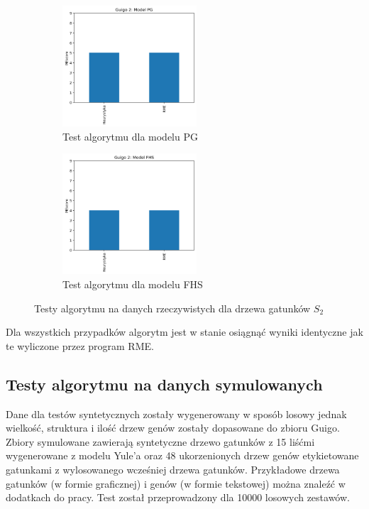 \documentclass[licencjacka]{pracamgr}
\begin{document}
\begin{figure}[H]
\centering
\begin{subfigure}{.5\textwidth}
  \centering
  \includegraphics[width=50mm]{./pictures/G2_PG.png}
  \caption{Test algorytmu dla modelu PG}
\end{subfigure}%
\begin{subfigure}{.5\textwidth}
  \centering
  \includegraphics[width=50mm]{./pictures/G2_FHS.png}
  \caption{Test algorytmu dla modelu FHS}
\end{subfigure}%
\caption{Testy algorytmu na danych rzeczywistych dla drzewa gatunków $S_2$}
\end{figure}

Dla wszystkich przypadków algorytm jest w stanie osiągnąć wyniki identyczne jak te wyliczone przez program RME. 

\subsection{Testy algorytmu na danych symulowanych}
Dane dla testów syntetycznych zostały wygenerowany w sposób losowy jednak wielkość, struktura i ilość drzew genów zostały dopasowane do zbioru Guigo. Zbiory symulowane zawierają syntetyczne drzewo gatunków z 15 liśćmi wygenerowane z modelu Yule'a \cite{pmid11259805} oraz 48 ukorzenionych drzew genów etykietowane gatunkami z wylosowanego wcześniej drzewa gatunków. Przykładowe drzewa gatunków (w formie graficznej) i genów (w formie tekstowej) można znaleźć w dodatkach do pracy. Test został przeprowadzony dla 10000 losowych zestawów.
\end{document}
